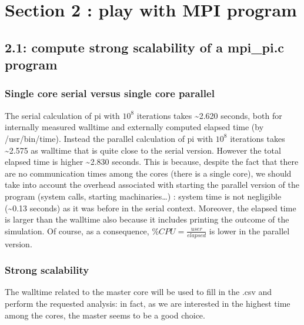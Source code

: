 \documentclass[
  10pt,
]{article}
\begin{document}
\hypertarget{section-2-play-with-mpi-program}{%
\section{Section 2 : play with MPI
program}\label{section-2-play-with-mpi-program}}

\hypertarget{compute-strong-scalability-of-a-mpi_pi.c-program}{%
\subsection{2.1: compute strong scalability of a mpi\_pi.c
program}\label{compute-strong-scalability-of-a-mpi_pi.c-program}}

\hypertarget{single-core-serial-versus-single-core-parallel}{%
\subsubsection{Single core serial versus single core
parallel}\label{single-core-serial-versus-single-core-parallel}}

The serial calculation of pi with \(10^8\) iterations takes
\textasciitilde2.620 seconds, both for internally measured walltime and
externally computed elapsed time (by /usr/bin/time). Instead the
parallel calculation of pi with \(10^8\) iterations takes
\textasciitilde2.575 as walltime that is quite close to the serial
version. However the total elapsed time is higher \textasciitilde2.830
seconds. This is because, despite the fact that there are no
communication times among the cores (there is a single core), we should
take into account the overhead associated with starting the parallel
version of the program (system calls, starting machinaries\ldots) :
system time is not negligible (\textasciitilde0.13 seconds) as it was
before in the serial context. Moreover, the elapsed time is larger than
the walltime also because it includes printing the outcome of the
simulation. Of course, as a consequence, \(\%CPU=\frac{user}{elapsed}\)
is lower in the parallel version.

\hypertarget{strong-scalability}{%
\subsubsection{Strong scalability}\label{strong-scalability}}

The walltime related to the master core will be used to fill in the .csv
and perform the requested analysis: in fact, as we are interested in the
highest time among the cores, the master seems to be a good choice.
\end{document}
